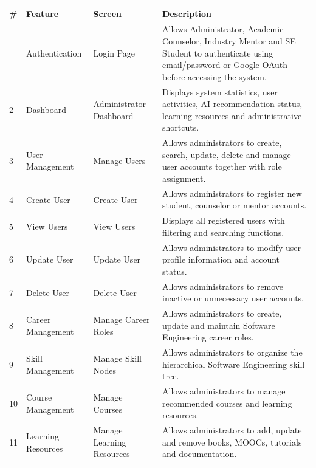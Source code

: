\begin{longtable}{|>{\centering\arraybackslash}p{0.8cm}|p{3.2cm}|p{3.5cm}|p{8cm}|}
\hline
\rowcolor[HTML]{F4D7D7}
\textbf{\#} &
\textbf{Feature} &
\textbf{Screen} &
\textbf{Description}
\\
\hline
\endfirsthead

\hline
\endhead

1 &
Authentication &
Login Page &
Allows Administrator, Academic Counselor, Industry Mentor and SE Student to authenticate using email/password or Google OAuth before accessing the system.
\\
\hline

2 &
Dashboard &
Administrator Dashboard &
Displays system statistics, user activities, AI recommendation status, learning resources and administrative shortcuts.
\\
\hline

3 &
User Management &
Manage Users &
Allows administrators to create, search, update, delete and manage user accounts together with role assignment.
\\
\hline

4 &
Create User &
Create User &
Allows administrators to register new student, counselor or mentor accounts.
\\
\hline

5 &
View Users &
View Users &
Displays all registered users with filtering and searching functions.
\\
\hline

6 &
Update User &
Update User &
Allows administrators to modify user profile information and account status.
\\
\hline

7 &
Delete User &
Delete User &
Allows administrators to remove inactive or unnecessary user accounts.
\\
\hline

8 &
Career Management &
Manage Career Roles &
Allows administrators to create, update and maintain Software Engineering career roles.
\\
\hline

9 &
Skill Management &
Manage Skill Nodes &
Allows administrators to organize the hierarchical Software Engineering skill tree.
\\
\hline

10 &
Course Management &
Manage Courses &
Allows administrators to manage recommended courses and learning resources.
\\
\hline

11 &
Learning Resources &
Manage Learning Resources &
Allows administrators to add, update and remove books, MOOCs, tutorials and documentation.
\\
\hline


\end{longtable}
